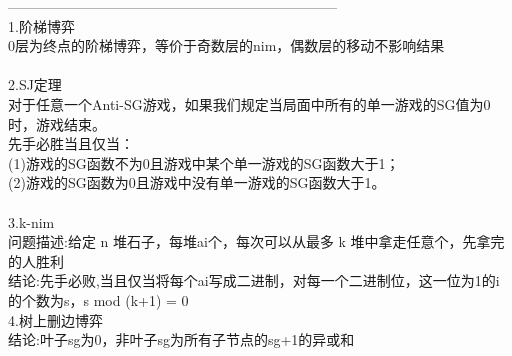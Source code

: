 ﻿-----------------------------------------------------------------------\\
1.阶梯博弈\\
0层为终点的阶梯博弈，等价于奇数层的nim，偶数层的移动不影响结果 \\
\\
2.SJ定理\\
对于任意一个Anti-SG游戏，如果我们规定当局面中所有的单一游戏的SG值为0时，游戏结束。\\
先手必胜当且仅当：\\
(1)游戏的SG函数不为0且游戏中某个单一游戏的SG函数大于1；\\
(2)游戏的SG函数为0且游戏中没有单一游戏的SG函数大于1。\\
\\
3.k-nim\\
问题描述:给定 n 堆石子，每堆ai个，每次可以从最多 k 堆中拿走任意个，先拿完的人胜利 \\
结论:先手必败,当且仅当将每个ai写成二进制，对每一个二进制位，这一位为1的i的个数为s，s mod (k+1) = 0\\
4.树上删边博弈\\
结论:叶子sg为0，非叶子sg为所有子节点的sg+1的异或和\\
\\